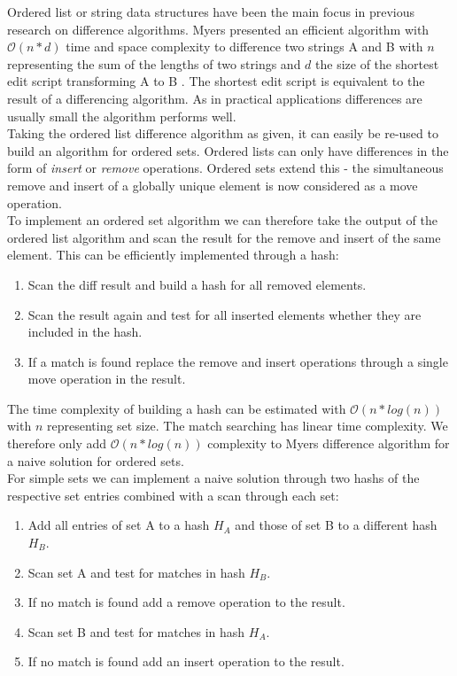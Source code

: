 Ordered list or string data structures have been the main focus in previous research on difference algorithms.
Myers presented an efficient algorithm with $\mathcal O(n*d) $ time and space complexity to difference two strings A and B with
$ n $ representing the sum of the lengths of two strings and $ d $ the size of the shortest edit script transforming A to B \cite{Myers:1986wi}.
The shortest edit script is equivalent to the result of a differencing algorithm.
As in practical applications differences are usually small the algorithm performs well.\\
Taking the ordered list difference algorithm as given, it can easily be re-used to build an algorithm for ordered sets.
Ordered lists can only have differences in the form of \emph{insert} or \emph{remove} operations.
Ordered sets extend this - the simultaneous remove and insert of a globally unique element is now considered as a move operation.\\

To implement an ordered set algorithm we can therefore take the output of the ordered list algorithm and scan the result for the remove and insert of the same element.
This can be efficiently implemented through a hash:

\begin{enumerate}
\item Scan the diff result and build a hash for all removed elements.
\item Scan the result again and test for all inserted elements whether they are included in the hash.
\item If a match is found replace the remove and insert operations through a single move operation in the result.
\end{enumerate}

The time complexity of building a hash can be estimated with $ \mathcal O(n * log(n)) $ with $ n $ representing set size.
The match searching has linear time complexity.
We therefore only add $ \mathcal O(n * log(n)) $ complexity to Myers difference algorithm for a naive solution for ordered sets.\\

For simple sets we can implement a naive solution through two hashs of the respective set entries combined with a scan through each set:

\begin{enumerate}
\item Add all entries of set A to a hash $ H_A $ and those of set B to a different hash $ H_B $.
\item Scan set A and test for matches in hash $ H_B $.
\item If no match is found add a remove operation to the result.
\item Scan set B and test for matches in hash $ H_A $.
\item If no match is found add an insert operation to the result.
\end{enumerate}

